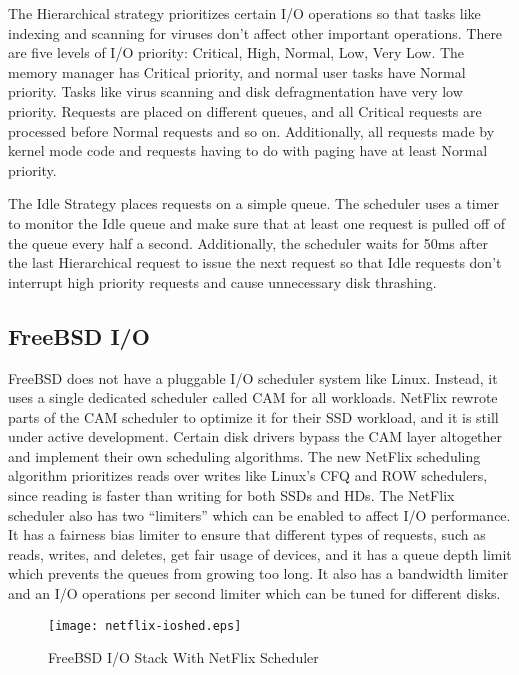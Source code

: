 \documentclass[10pt,conference,draftclsnofoot,onecolumn]{IEEEtran}
\begin{document}
The Hierarchical strategy prioritizes certain I/O operations so that tasks like indexing and scanning for viruses don't affect other important operations. There are five levels of I/O priority: Critical, High, Normal, Low, Very Low. The memory manager has Critical priority, and normal user tasks have Normal priority. Tasks like virus scanning and disk defragmentation have very low priority. Requests are placed on different queues, and all Critical requests are processed before Normal requests and so on. Additionally, all requests made by kernel mode code and requests having to do with paging have at least Normal priority.

The Idle Strategy places requests on a simple queue. The scheduler uses a timer to monitor the Idle queue and make sure that at least one request is pulled off of the queue every half a second. Additionally, the scheduler waits for 50ms after the last Hierarchical request to issue the next request so that Idle requests don't interrupt high priority requests and cause unnecessary disk thrashing\cite{2_russinovich_solomon_ionescu_2012}.

\subsection{FreeBSD I/O}
FreeBSD does not have a pluggable I/O scheduler system like Linux. Instead, it uses a single dedicated scheduler called CAM for all workloads. NetFlix rewrote parts of the CAM scheduler to optimize it for their SSD workload, and it is still under active development. Certain disk drivers bypass the CAM layer altogether and implement their own scheduling algorithms. The new NetFlix scheduling algorithm prioritizes reads over writes like Linux's CFQ and ROW schedulers, since reading is faster than writing for both SSDs and HDs. The NetFlix scheduler also has two ``limiters'' which can be enabled to affect I/O performance. It has a fairness bias limiter to ensure that different types of requests, such as reads, writes, and deletes, get fair usage of devices, and it has a queue depth limit which prevents the queues from growing too long. It also has a bandwidth limiter and an I/O operations per second limiter which can be tuned for different disks.

\begin{figure}[h]
    \centering
    \texttt{[image: netflix-ioshed.eps]}
    \caption{FreeBSD I/O Stack With NetFlix Scheduler}
\end{figure}
\end{document}
